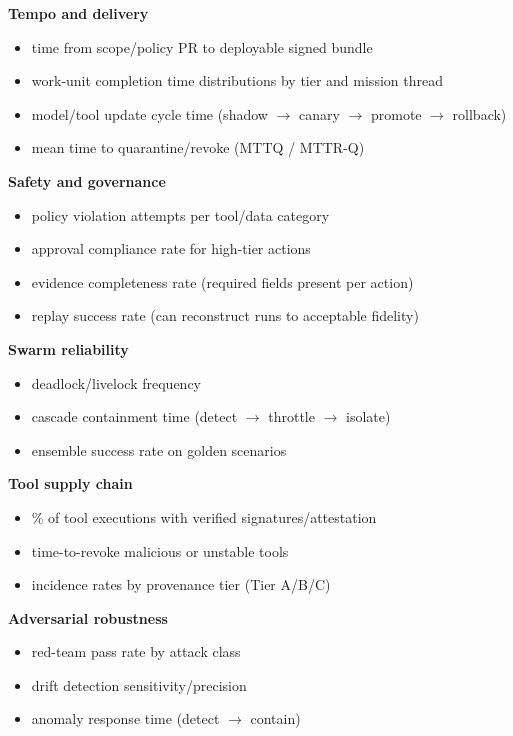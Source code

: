 \documentclass[11pt]{article}
\begin{document}
\textbf{Tempo and delivery}

\begin{itemize}
\tightlist
\item
  time from scope/policy PR to deployable signed bundle
\item
  work-unit completion time distributions by tier and mission thread
\item
  model/tool update cycle time (shadow \ensuremath{\rightarrow} canary \ensuremath{\rightarrow} promote \ensuremath{\rightarrow} rollback)
\item
  mean time to quarantine/revoke (MTTQ / MTTR-Q)
\end{itemize}

\textbf{Safety and governance}

\begin{itemize}
\tightlist
\item
  policy violation attempts per tool/data category
\item
  approval compliance rate for high-tier actions
\item
  evidence completeness rate (required fields present per action)
\item
  replay success rate (can reconstruct runs to acceptable fidelity)
\end{itemize}

\textbf{Swarm reliability}

\begin{itemize}
\tightlist
\item
  deadlock/livelock frequency
\item
  cascade containment time (detect \ensuremath{\rightarrow} throttle \ensuremath{\rightarrow} isolate)
\item
  ensemble success rate on golden scenarios
\end{itemize}

\textbf{Tool supply chain}

\begin{itemize}
\tightlist
\item
  \% of tool executions with verified signatures/attestation
\item
  time-to-revoke malicious or unstable tools
\item
  incidence rates by provenance tier (Tier A/B/C)
\end{itemize}

\textbf{Adversarial robustness}

\begin{itemize}
\tightlist
\item
  red-team pass rate by attack class
\item
  drift detection sensitivity/precision
\item
  anomaly response time (detect \ensuremath{\rightarrow} contain)
\end{itemize}
\end{document}
